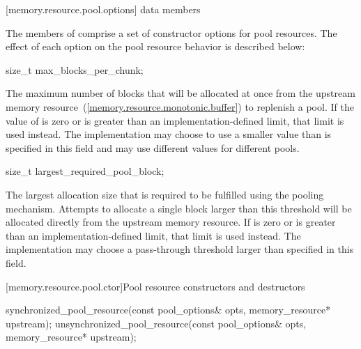 [memory.resource.pool.options]{ data members}

\pnum
The members of 
comprise a set of constructor options for pool resources.
The effect of each option on the pool resource behavior is described below:

%
\begin{itemdecl}
size_t max_blocks_per_chunk;
\end{itemdecl}

\begin{itemdescr}
\pnum
The maximum number of blocks that will be allocated at once
from the upstream memory resource~(\ref{memory.resource.monotonic.buffer})
to replenish a pool.
If the value of  is zero or
is greater than an implementation-defined limit, that limit is used instead.
The implementation
may choose to use a smaller value than is specified in this field and
may use different values for different pools.
\end{itemdescr}

%
\begin{itemdecl}
size_t largest_required_pool_block;
\end{itemdecl}

\begin{itemdescr}
\pnum
The largest allocation size that is required to be fulfilled
using the pooling mechanism.
Attempts to allocate a single block larger than this threshold
will be allocated directly from the upstream memory resource.
If  is zero or
is greater than an implementation-defined limit, that limit is used instead.
The implementation may choose a pass-through threshold
larger than specified in this field.
\end{itemdescr}

[memory.resource.pool.ctor]{Pool resource constructors and destructors}

%
%
\begin{itemdecl}
synchronized_pool_resource(const pool_options& opts, memory_resource* upstream);
unsynchronized_pool_resource(const pool_options& opts, memory_resource* upstream);
\end{itemdecl}

